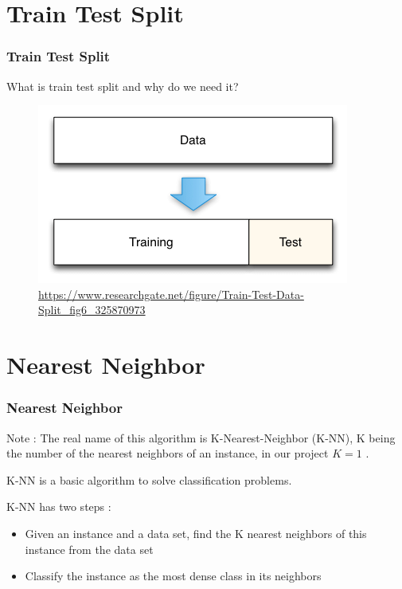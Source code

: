\documentclass{beamer}
\begin{document}
\section{Train Test Split}

\begin{frame}
\frametitle{Train Test Split}
What is train test split and why do we need it?
\begin{figure}
\centering
\includegraphics[scale=0.4]{Train-Test-Data-Split.png}
\caption{\url{https://www.researchgate.net/figure/Train-Test-Data-Split_fig6_325870973}}
\end{figure}
\end{frame}

\section{Nearest Neighbor}

\begin{frame}
\frametitle{Nearest Neighbor}
\begin{alertblock}{Note :}
The real name of this algorithm is K-Nearest-Neighbor (K-NN), K being the number of the nearest neighbors of an instance, in our project $ K = 1 $ .
\end{alertblock}
K-NN is a basic algorithm to solve classification problems.
\begin{block}{K-NN has two steps :}
\begin{itemize}
\item Given an instance and a data set, find the K nearest neighbors of this instance from the data set
\item Classify the instance as the most dense class in its neighbors
\end{itemize}
\end{block}
\end{frame}
\end{document}

